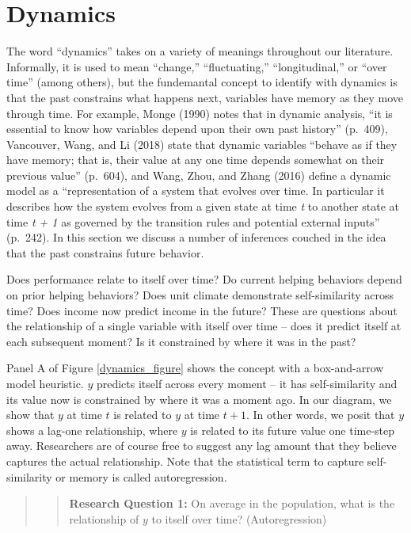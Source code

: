 \documentclass[english,,man]{apa6}
\begin{document}
\hypertarget{dynamics}{%
\section{Dynamics}\label{dynamics}}

The word \enquote{dynamics} takes on a variety of meanings throughout our literature. Informally, it is used to mean \enquote{change,} \enquote{fluctuating,} \enquote{longitudinal,} or \enquote{over time} (among others), but the fundemantal concept to identify with dynamics is that the past constrains what happens next, variables have memory as they move through time. For example, Monge (1990) notes that in dynamic analysis, \enquote{it is essential to know how variables depend upon their own past history} (p.~409), Vancouver, Wang, and Li (2018) state that dynamic variables \enquote{behave as if they have memory; that is, their value at any one time depends somewhat on their previous value} (p.~604), and Wang, Zhou, and Zhang (2016) define a dynamic model as a \enquote{representation of a system that evolves over time. In particular it describes how the system evolves from a given state at time \emph{t} to another state at time \emph{t + 1} as governed by the transition rules and potential external inputs} (p.~242). In this section we discuss a number of inferences couched in the idea that the past constrains future behavior.

Does performance relate to itself over time? Do current helping behaviors depend on prior helping behaviors? Does unit climate demonstrate self-similarity across time? Does income now predict income in the future? These are questions about the relationship of a single variable with itself over time -- does it predict itself at each subsequent moment? Is it constrained by where it was in the past?

Panel A of Figure \ref{dynamics_figure} shows the concept with a box-and-arrow model heuristic. \(y\) predicts itself across every moment -- it has self-similarity and its value now is constrained by where it was a moment ago. In our diagram, we show that \(y\) at time \(t\) is related to \(y\) at time \(t + 1\). In other words, we posit that \(y\) shows a lag-one relationship, where \(y\) is related to its future value one time-step away. Researchers are of course free to suggest any lag amount that they believe captures the actual relationship. Note that the statistical term to capture self-similarity or memory is called autoregression.

\begin{quote}
\begin{quote}
\textbf{Research Question 1:} On average in the population, what is the relationship of \(y\) to itself over time? (Autoregression)
\end{quote}
\end{quote}
\end{document}
